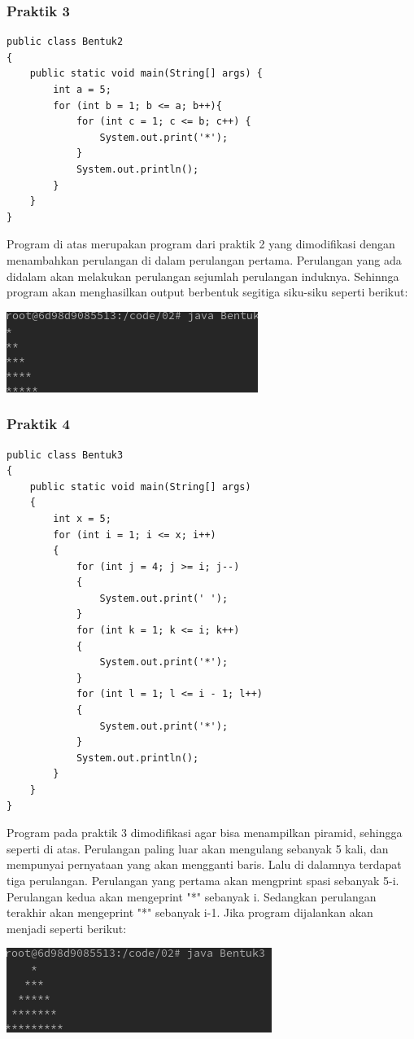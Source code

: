 \documentclass[a4paper,12pt]{article}
\begin{document}
\subsubsection{Praktik 3}
\begin{lstlisting}
public class Bentuk2
{
    public static void main(String[] args) {
        int a = 5;
        for (int b = 1; b <= a; b++){
            for (int c = 1; c <= b; c++) {
                System.out.print('*');
            }
            System.out.println();
        }
    }
}
\end{lstlisting}
Program di atas merupakan program dari praktik 2 yang dimodifikasi dengan menambahkan perulangan di dalam perulangan pertama. Perulangan yang ada didalam akan melakukan perulangan
sejumlah perulangan induknya. Sehinnga program akan menghasilkan output berbentuk segitiga siku-siku seperti berikut:\\
\begin{center}
    \includegraphics[scale=.7]{4.png}
\end{center}

\subsubsection{Praktik 4}
\begin{lstlisting}
public class Bentuk3
{
    public static void main(String[] args)
    {
        int x = 5;
        for (int i = 1; i <= x; i++)
        {
            for (int j = 4; j >= i; j--)
            {
                System.out.print(' ');
            }
            for (int k = 1; k <= i; k++)
            {
                System.out.print('*');
            }
            for (int l = 1; l <= i - 1; l++)
            {
                System.out.print('*');
            }
            System.out.println();
        }
    }
}
\end{lstlisting}
Program pada praktik 3 dimodifikasi agar bisa menampilkan piramid, sehingga seperti di atas. Perulangan paling luar akan mengulang sebanyak 5 kali, dan 
mempunyai pernyataan yang akan mengganti baris. Lalu di dalamnya terdapat tiga perulangan. Perulangan yang pertama akan mengprint spasi sebanyak 5-i. Perulangan 
kedua akan mengeprint "*" sebanyak i. Sedangkan perulangan terakhir akan mengeprint "*" sebanyak i-1. Jika program dijalankan akan menjadi seperti berikut:\\
\begin{center}
    \includegraphics[scale=.7]{5.png}
\end{center}
\end{document}

